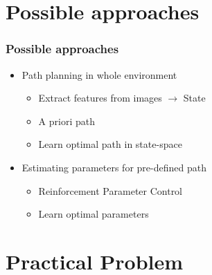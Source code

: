 \documentclass{beamer}
\begin{document}
\section{Possible approaches}
\begin{frame}
  \frametitle{Possible approaches}
  \begin{itemize}
    \item Path planning in whole environment
    \begin{itemize}
      \item Extract features from images $\rightarrow$ State
      \item A priori path
      \item Learn optimal path in state-space
    \end{itemize}
    \item Estimating parameters for pre-defined path
    \begin{itemize}
      \item Reinforcement Parameter Control
      \item Learn optimal parameters
    \end{itemize}
  \end{itemize}
\end{frame}



\section{Practical Problem}
\end{document}
